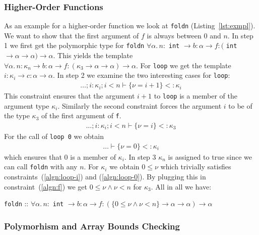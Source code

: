 \documentclass[a4paper,UKenglish]{lipics-v2016}
\begin{document}
\subsubsection{Higher-Order Functions}
As an example for a higher-order function we look at \lstinline{foldn} (Listing~\ref{lst:exmpl}).
We want to show that the first argument of $f$ is always between $0$ and $n$.
In step 1 we first get the polymorphic type for \lstinline{foldn}
$\forall \alpha.\,n:$ \lstinline{int} $\rightarrow b: \alpha \rightarrow f:($ \lstinline{int} $\rightarrow \alpha \rightarrow \alpha) \rightarrow \alpha$.
This yields the template
$\forall \alpha.\,n: \kappa_n \rightarrow b: \alpha \rightarrow f:(\kappa_3 \rightarrow \alpha \rightarrow \alpha) \rightarrow \alpha$.
For \lstinline{loop} we get the template $i: \kappa_i \rightarrow c: \alpha \rightarrow \alpha$.
In step 2 we examine the two interesting cases for \lstinline{loop}:
\begin{align}
    \label{algn:loop-i}
    \dots; i: \kappa_i; i < n \vdash \{\nu = i + 1 \} <: \kappa_i
\end{align}
This constraint ensures that the argument $i + 1$ to \lstinline{loop} is a member of the argument type $\kappa_i$.
Similarly the second constraint forces the argument $i$ to be of the type $\kappa_3$ of the first argument of \lstinline{f}.
\begin{align}
    \label{algn:f}
    \dots; i: \kappa_i; i < n \vdash \{\nu = i \} <: \kappa_3
\end{align}
For the call of \lstinline{loop 0} we obtain
\begin{align}
    \label{algn:loop-0}
    \dots \vdash \{\nu = 0 \} <: \kappa_i
\end{align}
which ensures that $0$ is a member of $\kappa_i$.
In step 3 $\kappa_n$ is assigned to true since we can call \lstinline{foldn} with any $n$.
For $\kappa_i$ we obtain $0 \le \nu$ which trivially satisfies constraints~(\ref{algn:loop-i}) and (\ref{algn:loop-0}).
By plugging this in constraint~(\ref{algn:f}) we get $0 \le \nu \land \nu < n$ for $\kappa_3$.
All in all we have:
\begin{center}
    \lstinline{foldn} :: $\forall \alpha.\,n:$ \lstinline{int} $\rightarrow b: \alpha \rightarrow f:(\{0 \le \nu \land \nu < n\} \rightarrow \alpha \rightarrow \alpha) \rightarrow \alpha$
\end{center}

\subsubsection{Polymorhism and Array Bounds Checking}
\end{document}

